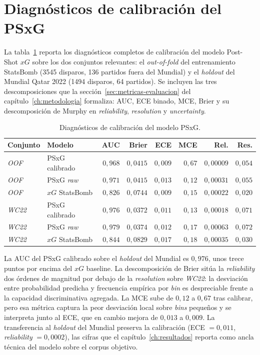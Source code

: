 \section{Diagnósticos de calibración del PSxG}
\label{anexo:val-psxg}

La tabla~\ref{tab:psxg-cal} reporta los diagnósticos completos de
calibración del modelo Post-Shot $xG$ sobre los dos conjuntos
relevantes: el \textit{out-of-fold} del entrenamiento StatsBomb
(3545 disparos, 136 partidos fuera del Mundial) y el \textit{holdout}
del Mundial Qatar 2022 (1494 disparos, 64 partidos). Se incluyen
las tres descomposiciones que la sección~\ref{sec:metricas-evaluacion}
del capítulo~\ref{ch:metodologia} formaliza: AUC, ECE binado, MCE,
Brier y su descomposición de Murphy en \textit{reliability},
\textit{resolution} y \textit{uncertainty}.

\begin{table}[h]
  \centering
  \small
  \caption{Diagnósticos de calibración del modelo PSxG.}
  \label{tab:psxg-cal}
  \begin{tabular}{llrrrrrr}
    \toprule
    Conjunto & Modelo & AUC & Brier & ECE & MCE & Rel. & Res. \\
    \midrule
    \textit{OOF}   & PSxG calibrado    & $0{,}968$ & $0{,}0415$ & $0{,}009$ & $0{,}67$ & $0{,}00009$ & $0{,}054$ \\
    \textit{OOF}   & PSxG \textit{raw} & $0{,}971$ & $0{,}0415$ & $0{,}013$ & $0{,}12$ & $0{,}00031$ & $0{,}055$ \\
    \textit{OOF}   & $xG$ StatsBomb    & $0{,}826$ & $0{,}0744$ & $0{,}009$ & $0{,}15$ & $0{,}00022$ & $0{,}020$ \\
    \midrule
    \textit{WC22}  & PSxG calibrado    & $0{,}976$ & $0{,}0372$ & $0{,}011$ & $0{,}13$ & $0{,}00018$ & $0{,}071$ \\
    \textit{WC22}  & PSxG \textit{raw} & $0{,}979$ & $0{,}0374$ & $0{,}012$ & $0{,}17$ & $0{,}00063$ & $0{,}072$ \\
    \textit{WC22}  & $xG$ StatsBomb    & $0{,}844$ & $0{,}0829$ & $0{,}017$ & $0{,}18$ & $0{,}00035$ & $0{,}030$ \\
    \bottomrule
  \end{tabular}
\end{table}

La AUC del PSxG calibrado sobre el \textit{holdout} del Mundial es
$0{,}976$, unos trece puntos por encima del $xG$ baseline. La
descomposición de Brier sitúa la \textit{reliability} dos órdenes de
magnitud por debajo de la \textit{resolution} sobre \textit{WC22}: la
desviación entre probabilidad predicha y frecuencia empírica por
\textit{bin} es despreciable frente a la capacidad discriminativa
agregada. La MCE sube de $0{,}12$ a $0{,}67$ tras calibrar, pero esa
métrica captura la peor desviación local sobre \textit{bins} pequeños
y se interpreta junto al ECE, que en cambio mejora de $0{,}013$ a
$0{,}009$. La transferencia al \textit{holdout} del Mundial preserva
la calibración (ECE $= 0{,}011$, \textit{reliability} $= 0{,}0002$),
las cifras que el capítulo~\ref{ch:resultados} reporta como ancla
técnica del modelo sobre el corpus objetivo.

